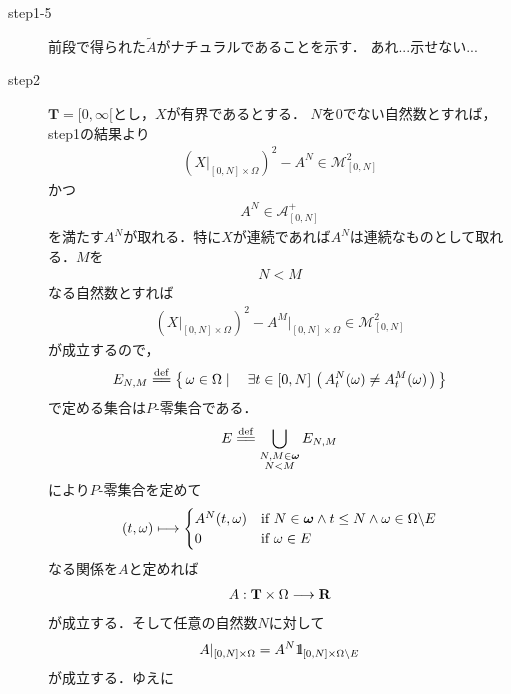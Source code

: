 \begin{sketch}
\begin{description}
			\item[step1-5]
				前段で得られた$\tilde{A}$がナチュラルであることを示す．
				あれ...示せない...
				
			\item[step2]
				$\mathbf{T}=[0,\infty[$とし，$X$が有界であるとする．
				$N$を$0$でない自然数とすれば，step1の結果より
				\begin{align}
					\left(X|_{[0,N] \times \Omega}\right)^2 - A^N \in \mathscr{M}^2_{[0,N]}
				\end{align}
				かつ
				\begin{align}
					A^N \in \mathscr{A}^+_{[0,N]}
				\end{align}
				を満たす$A^N$が取れる．特に$X$が連続であれば$A^N$は連続なものとして取れる．$M$を
				\begin{align}
					N < M
				\end{align}
				なる自然数とすれば
				\begin{align}
					\left(X|_{[0,N] \times \Omega}\right)^2 - A^M|_{[0,N] \times \Omega} \in \mathscr{M}^2_{[0,N]}
				\end{align}
				が成立するので，
				\begin{align}
					E_{N,M} \defeq \Set{\omega \in \Omega}{\exists t \in [0,N]\,
					\left(\, A^N_t(\omega) \neq A^M_t(\omega)\, \right)}
				\end{align}
				で定める集合は$P$-零集合である．
				\begin{align}
					E \defeq \bigcup_{\substack{N,M \in \Natural \\ N < M}} E_{N,M}
				\end{align}
				により$P$-零集合を定めて
				\begin{align}
					(t,\omega) \longmapsto
					\begin{cases}
						A^N(t,\omega) & \mbox{if } N \in {\boldsymbol \omega} \wedge t \leq N \wedge \omega \in \Omega \backslash E \\
						0 & \mbox{if } \omega \in E
					\end{cases}	
				\end{align}
				なる関係を$A$と定めれば
				\begin{align}
					A:\mathbf{T} \times \Omega \longrightarrow \mathbf{R}
				\end{align}
				が成立する．そして任意の自然数$N$に対して
				\begin{align}
					A|_{[0,N] \times \Omega} = A^N \mbox{1}\hspace{-0.25em}\mbox{l}_{[0,N] \times \Omega \backslash E}
				\end{align}
				が成立する．ゆえに
				\begin{align}

\end{align}
\end{description}
\end{sketch}
